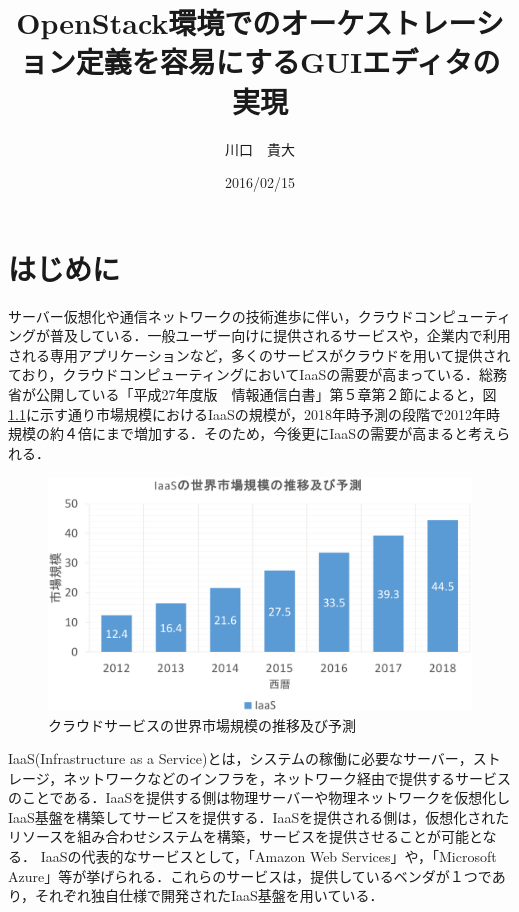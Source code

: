 \documentclass[mingoth]{kut-paper}		%
\title{OpenStack環境でのオーケストレーション定義を容易にするGUIエディタの実現}
\author{川口　貴大}
\date{2016/02/15}
\begin{document}
\maketitle

\chapter{はじめに}
%
	
	サーバー仮想化や通信ネットワークの技術進歩に伴い，クラウドコンピューティングが普及している．一般ユーザー向けに提供されるサービスや，企業内で利用される専用アプリケーションなど，多くのサービスがクラウドを用いて提供されており，クラウドコンピューティングにおいてIaaSの需要が高まっている．総務省が公開している「平成27年度版　情報通信白書」第５章第２節によると，図\ref{graf:1}に示す通り市場規模におけるIaaSの規模が，2018年時予測の段階で2012年時規模の約４倍にまで増加する．\cite{bib:1}そのため，今後更にIaaSの需要が高まると考えられる．
	\begin{figure}[H]
		\begin{center}
			\includegraphics[scale=0.4]{Document/IaaSGrafNew.eps}
			\caption{クラウドサービスの世界市場規模の推移及び予測}
			\label{graf:1}
		\end{center}
	\end{figure}
	
	IaaS(Infrastructure as a Service)とは，システムの稼働に必要なサーバー，ストレージ，ネットワークなどのインフラを，ネットワーク経由で提供するサービスのことである．\cite{bib:2}IaaSを提供する側は物理サーバーや物理ネットワークを仮想化しIaaS基盤を構築してサービスを提供する．IaaSを提供される側は，仮想化されたリソースを組み合わせシステムを構築，サービスを提供させることが可能となる．
	IaaSの代表的なサービスとして，「Amazon Web Services」や，「Microsoft Azure」等が挙げられる．これらのサービスは，提供しているベンダが１つであり，それぞれ独自仕様で開発されたIaaS基盤を用いている．
	
\end{document}
